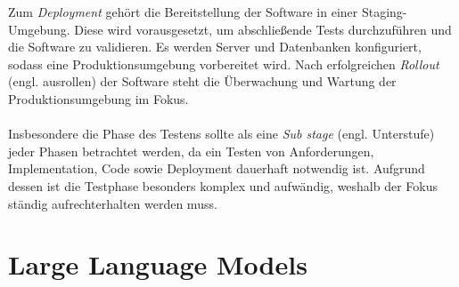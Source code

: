 Zum \textit{Deployment} gehört die Bereitstellung der Software in einer Staging-Umgebung. Diese wird vorausgesetzt, um abschließende Tests durchzuführen und die Software zu validieren. Es werden Server und Datenbanken konfiguriert, sodass eine Produktionsumgebung vorbereitet wird. Nach erfolgreichen \textit{Rollout} (engl. ausrollen) der Software steht die Überwachung und Wartung der Produktionsumgebung im Fokus. \cite*{hossainSoftwareDevelopmentLife2023}\\\\
Insbesondere die Phase des Testens sollte als eine \textit{Sub stage} (engl. Unterstufe) jeder Phasen betrachtet werden, da ein Testen von Anforderungen, Implementation, Code sowie Deployment dauerhaft notwendig ist. Aufgrund dessen ist die Testphase besonders komplex und aufwändig, weshalb der Fokus ständig aufrechterhalten werden muss. \cite*{tikySoftwareDevelopmentLife}

\section{Large Language Models}
